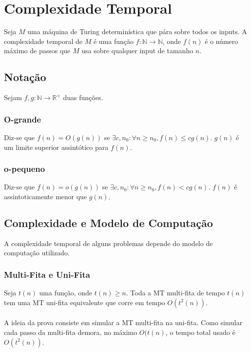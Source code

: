 \documentclass[10pt,a4paper]{report}
\begin{document}
\chapter{Complexidade Temporal}
Seja $M$ uma máquina de Turing determinística que pára sobre todos os inputs. A complexidade temporal de $M$ é uma função $f: \mathbb{N} \rightarrow \mathbb{N}$, onde $f(n)$ é o número máximo de passos que $M$ usa sobre qualquer input de tamanho $n$.
\section{Notação}
Sejam $f,g: \mathbb{N} \rightarrow \mathbb{R}^+$ duas funções.
\subsection{O-grande}
Diz-se que $f(n) = O(g(n))$ se $\exists c, n_0: \forall n \geq n_0, f(n) \leq cg(n)$. $g(n)$ é um limite superior assintótico para $f(n)$.
\subsection{o-pequeno}
Diz-se que $f(n) = o(g(n))$ se $\exists c, n_0: \forall n \geq n_0, f(n) < cg(n)$. $f(n)$ é assintoticamente menor que $g(n)$.
\section{Complexidade e Modelo de Computação}
A complexidade temporal de alguns problemas depende do modelo de computação utilizado.
\subsection{Multi-Fita e Uni-Fita}
Seja $t(n)$ uma função, onde $t(n) \geq n$. Toda a MT multi-fita de tempo $t(n)$ tem uma MT uni-fita equivalente que corre em tempo $O(t^2(n))$.\\
\\
A ideia da prova consiste em simular a MT multi-fita na uni-fita. Como simular cada passo da multi-fita demora, no máximo $O(t(n)$, o tempo total usado é $O(t^2(n))$.
\end{document}
